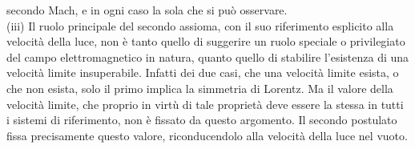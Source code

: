 \documentclass[a4paper,11pt]{book}
\theoremstyle{plain}
\theoremstyle{definition}
\begin{document}
secondo Mach, e in ogni caso la sola che si può osservare. \\
(iii) Il ruolo principale del secondo assioma, con il suo riferimento esplicito alla velocità della 
luce, non è tanto quello di suggerire un ruolo speciale o privilegiato del campo elettromagnetico in 
natura, quanto quello di stabilire l'esistenza di una velocità limite insuperabile. Infatti dei 
due casi, che una velocità limite esista, o che non esista, solo il primo implica la simmetria 
di Lorentz. Ma il valore della velocità limite, che proprio in virtù di tale proprietà deve 
essere la stessa in tutti i sistemi di riferimento, non è fissato da questo argomento. Il 
secondo postulato fissa precisamente questo valore, riconducendolo alla velocità della luce 
nel vuoto. \\
\end{document}
